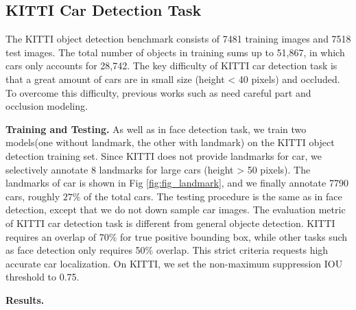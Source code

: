  
\subsection{ KITTI Car Detection Task}
The KITTI object detection benchmark consists of 7481 training images and 7518 test images. The total number of objects in training sums up to 51,867, in which cars only accounts for 28,742. The key difficulty of KITTI car detection task is that a great amount of cars are in small size (height < 40 pixels) and occluded.  To overcome this difficulty,  previous works such as\cite{li2014integrating} need careful part and occlusion modeling. 

\textbf{Training and Testing.} As well as in face detection task, we train two models(one without landmark, the other with landmark) on the KITTI object detection training set. Since KITTI does not provide landmarks for car, we selectively annotate 8 landmarks for large cars (height > 50 pixels). The landmarks of car is shown in Fig \ref{fig:fig_landmark}, and we finally annotate 7790 cars, roughly $27\%$ of the total cars. The testing procedure is the same as in face detection, except that we do not down sample car images. The evaluation metric of KITTI car detection task is different from general objecte detection. KITTI requires an overlap of 70\% for true positive bounding box, while other tasks such as face detection only requires 50\% overlap. This strict criteria requests high accurate car localization. On KITTI, we set the non-maximum suppression  IOU threshold to 0.75. 

\textbf{Results.} 

